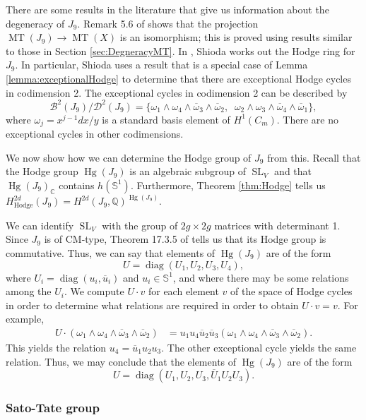 \documentclass[reqno, oneside, 12pt]{amsart}
\DeclareMathOperator{\SL}{SL}
\DeclareMathOperator{\diag}{diag}
\DeclareMathOperator{\Hg}{Hg}
\DeclareMathOperator{\MT}{MT}
\newcommand{\Q}{\mathbb{Q}}
\newcommand{\C}{\mathbb{C}}
\theoremstyle{remark}
\numberwithin{equation}{section}
\begin{document}
There are some results in the literature that give us information about the degeneracy of $J_9$. Remark 5.6 of \cite{Lombardo2021} shows that the projection $\MT(J_9)\rightarrow \MT(X)$ is an isomorphism; this is proved using results similar to those in Section \ref{sec:DegneracyMT}. In \cite[Example 6.1]{Shioda82}, Shioda works out the Hodge ring for $J_9$. In particular, Shioda uses a result that is a special case of  Lemma \ref{lemma:exceptionalHodge} to determine that there are exceptional Hodge cycles in codimension 2. The exceptional cycles in codimension 2 can be described by
$$\mathcal B^2(J_9)/\mathcal D^2(J_9)=\{\omega_1\wedge\omega_4\wedge\overline\omega_3\wedge\overline\omega_2, \;\; \omega_2\wedge\omega_3\wedge\overline\omega_4\wedge\overline\omega_1 \},$$
where $\omega_j=x^{j-1}dx/y$ is a standard basis element of $H^1(C_m)$. There are no exceptional cycles in other codimensions.

We now show how we can determine the Hodge group of $J_9$ from this. Recall that the Hodge group $\Hg(J_9)$ is an algebraic subgroup of $\SL_V$ and that $\Hg(J_9)_\C$ contains $h(\mathbb S^1)$. Furthermore, Theorem \ref{thm:Hodge} tells us $H^{2d}_\text{Hodge}(J_9)= H^{2d}(J_9,\Q)^{\Hg(J_9)}.$

We can identify $\SL_V$ with the group of $2g\times2g$ matrices with determinant 1. Since  $J_9$ is of CM-type, Theorem 17.3.5 of \cite{BirkenhakeLange2004} tells us that its Hodge group is commutative. Thus, we can say that elements of $\Hg(J_9)$ are of the form
$$U=\diag(U_1, U_2, U_3, U_4),$$
where $U_i=\diag(u_i,\overline u_i)$ and $u_i\in \mathbb S^1$, and where there may be some relations among the $U_i$.  We compute $U\cdot v$ for each element $v$ of the space of Hodge cycles in order to determine what relations are required in order to obtain $U\cdot v=v$. For example,
\begin{align*}
    U\cdot(\omega_1\wedge\omega_4\wedge\overline\omega_3\wedge\overline\omega_2)&=u_1u_4\overline u_2\overline u_3(\omega_1\wedge\omega_4\wedge\overline\omega_3\wedge\overline\omega_2).
\end{align*}
This yields the relation $u_4=\overline u_1u_2u_3$. The other exceptional cycle yields the same relation. Thus, we may conclude that the elements of $\Hg(J_9)$ are of the form
$$U=\diag(U_1,U_2,U_3,\overline U_1U_2U_3).$$

\subsubsection{Sato-Tate group}
\end{document}
